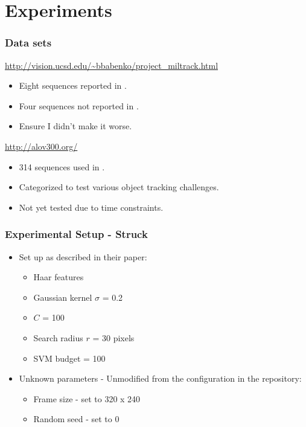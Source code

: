 \section{Experiments}

\begin{frame}
    \frametitle{Data sets}
    \url{http://vision.ucsd.edu/~bbabenko/project_miltrack.html}
    \begin{itemize}
        \item Eight sequences reported in \cite{6126251}.
        \item Four sequences not reported in \cite{6126251}.
        \item Ensure I didn't make it worse.
    \end{itemize}
    \url{http://alov300.org/}
    \begin{itemize}
        \item 314 sequences used in \cite{6671560}.
        \item Categorized to test various object tracking challenges.
        \item \alert{Not yet tested due to time constraints.}
    \end{itemize}
\end{frame}

\begin{frame}
    \frametitle{Experimental Setup - Struck}
    \begin{itemize}
        \item Set up as described in their paper:
            \begin{itemize}
                \item Haar features
                \item Gaussian kernel \(\sigma\) = 0.2
                \item \(C\) = 100
                \item Search radius \(r\) = 30 pixels
                \item SVM budget = 100
            \end{itemize}
        \item Unknown parameters - Unmodified from the configuration in the repository:
            \begin{itemize}
                \item Frame size - set to 320 x 240
                \item Random seed - set to 0
            \end{itemize}
    \end{itemize}
\end{frame}

